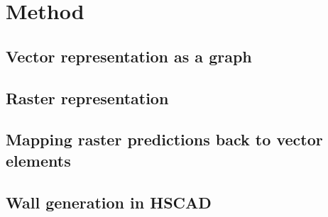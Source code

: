 \chapter{Method}
\label{ch:method}

\section{Vector representation as a graph}

\section{Raster representation}

\section{Mapping raster predictions back to vector elements}

\section{Wall generation in HSCAD}
